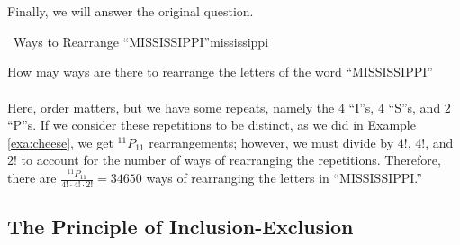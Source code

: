         \vphantom
        \\
        \\
        Finally, we will answer the original question.
        \begin{exercise}{\Difficulty\,\Difficulty\,\,Ways to Rearrange ``MISSISSIPPI''}{mississippi}
        
            How may ways are there to rearrange the letters of the word ``MISSISSIPPI''
            \\
            \\
            Here, order matters, but we have some repeats, namely the \(4\) ``I''s, \(4\) ``S''s, and \(2\) ``P''s. If we consider these repetitions to be distinct, as we did in Example \ref{exa:cheese}, we get \(^{11}P_{11}\) rearrangements; however, we must divide by \(4!\), \(4!\), and \(2!\) to account for the number of ways of rearranging the repetitions. Therefore, there are \(\frac{^{11}P_{11}}{4!\cdot4!\cdot2!}=34650\) ways of rearranging the letters in ``MISSISSIPPI.''
            
        \end{exercise}
        
    \pagebreak
        
    \subsection{The Principle of Inclusion-Exclusion}
    
